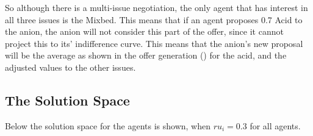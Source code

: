 So although there is a multi-issue negotiation, the only agent that has interest in all three issues is the Mixbed. This means that if an agent proposes 0.7 Acid to the anion, the anion will not consider this part of the offer, since it cannot project this to its' indifference curve. This means that the anion's new proposal will be the average as shown in the offer generation () for the acid, and the adjusted values to the other issues.
\clearpage
\subsection{The Solution Space}
Below the solution space for the agents is shown, when $ru_i = 0.3$ for all agents.
\begin{figure}[h]
\end{figure}
